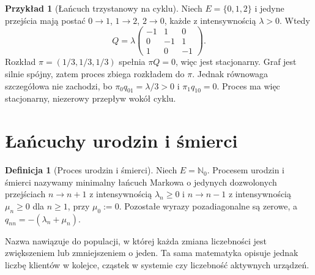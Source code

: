 \documentclass[11pt,a4paper,oneside]{report}
\numberwithin{equation}{chapter}
\theoremstyle{plain}
\theoremstyle{definition}
\newtheorem{definicja}{Definicja}[chapter]
\newtheorem{przyklad}{Przykład}[chapter]
\theoremstyle{remark}
\newcommand{\N}{\mathbb{N}}
\begin{document}
\begin{przyklad}[Łańcuch trzystanowy na cyklu]
Niech $E=\{0,1,2\}$ i jedyne przejścia mają postać
$0\to1$, $1\to2$, $2\to0$, każde z intensywnością
$\lambda>0$. Wtedy
\[
Q=\lambda\begin{pmatrix}-1&1&0\\0&-1&1\\1&0&-1\end{pmatrix}.
\]
Rozkład $\pi=(1/3,1/3,1/3)$ spełnia $\pi Q=0$,
więc jest stacjonarny. Graf jest silnie spójny,
zatem proces zbiega rozkładem do $\pi$.
Jednak równowaga szczegółowa nie zachodzi, bo
$\pi_0q_{01}=\lambda/3>0$ i $\pi_1q_{10}=0$.
Proces ma więc stacjonarny, niezerowy przepływ wokół cyklu.
\end{przyklad}

\section{Łańcuchy urodzin i śmierci}
\begin{definicja}[Proces urodzin i śmierci]
Niech $E=\N_0$. Procesem urodzin i śmierci nazywamy
minimalny łańcuch Markowa o jedynych dozwolonych przejściach
$n\to n+1$ z intensywnością $\lambda_n\ge0$ i
$n\to n-1$ z intensywnością $\mu_n\ge0$ dla $n\ge1$,
przy $\mu_0:=0$. Pozostałe wyrazy pozadiagonalne są zerowe,
a $q_{nn}=-(\lambda_n+\mu_n)$.
\end{definicja}

Nazwa nawiązuje do populacji, w której każda zmiana liczebności
jest zwiększeniem lub zmniejszeniem o jeden. Ta sama
matematyka opisuje jednak liczbę klientów w kolejce, cząstek
w systemie czy liczebność aktywnych urządzeń.
\end{document}
